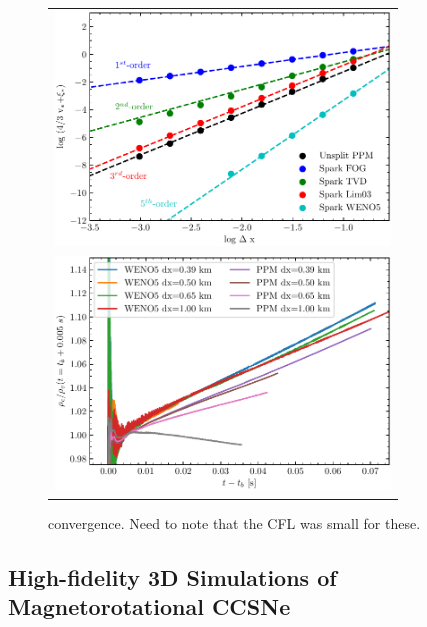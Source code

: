 \begin{figure}
  \begin{tabular}{c}
    \includegraphics[width=3.5in]{figs/convergence}\\
    \includegraphics[width=3.5in]{figs/centralDens}
  \end{tabular}
  \caption{convergence. Need to note that the CFL was small for these.}
  \label{fig:converge}
\end{figure}

\vspace{0.1in}   \vspace{-0.1in}

\subsection{High-fidelity 3D Simulations of Magnetorotational CCSNe}
\label{sec:Y1mrccsn}

